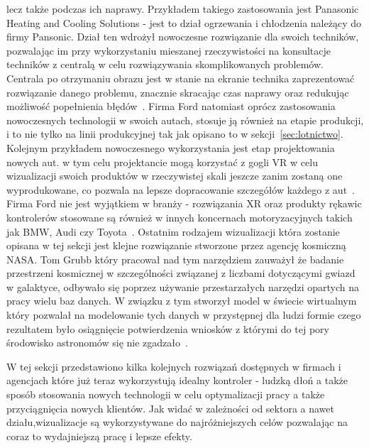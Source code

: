 lecz także podczas ich naprawy. Przykładem takiego zastosowania jest Panasonic Heating and Cooling Solutions - jest to dział ogrzewania i chłodzenia należący do firmy Pansonic. Dział ten wdrożył nowoczesne rozwiązanie dla swoich techników, pozwalając im przy wykorzystaniu  mieszanej rzeczywistości na konsultacje techników z centralą w celu rozwiązywania skomplikowanych problemów. Centrala po otrzymaniu obrazu jest w stanie na ekranie technika zaprezentować rozwiązanie danego problemu, znacznie skracając czas naprawy oraz redukując możliwość popełnienia błędów~\cite{pana}. Firma Ford natomiast oprócz zastosowania nowoczesnych technologii w swoich autach, stosuje ją również na etapie produkcji, i to nie tylko na linii produkcyjnej tak jak opisano to w sekcji~\ref{sec:lotnictwo}. Kolejnym przykładem nowoczesnego wykorzystania jest etap projektowania nowych aut. w tym celu projektancie mogą korzystać z gogli VR w celu wizualizacji swoich produktów w rzeczywistej skali jeszcze zanim zostaną one wyprodukowane, co pozwala na lepsze dopracowanie szczegółów każdego z aut~\cite{wiz1}. Firma Ford nie jest wyjątkiem w branży - rozwiązania XR oraz produkty rękawic kontrolerów stosowane są również w innych koncernach motoryzacyjnych takich jak BMW, Audi czy Toyota~\cite{manus}. Ostatnim rodzajem wizualizacji która zostanie opisana w tej sekcji jest klejne rozwiązanie stworzone przez agencję kosmiczną NASA. Tom Grubb który pracował nad tym narzędziem zauważył że badanie przestrzeni kosmicznej w szczególności związanej z liczbami dotyczącymi gwiazd w galaktyce, odbywało się poprzez używanie przestarzałych narzędzi opartych na pracy wielu baz danych. W związku z tym stworzył model w świecie wirtualnym który pozwalał na modelowanie tych danych w przystępnej dla ludzi formie czego rezultatem było osiągnięcie potwierdzenia wniosków z którymi do tej pory środowisko astronomów się nie zgadzało~\cite{nasa2}.
	
	 W tej sekcji przedstawiono kilka kolejnych rozwiązań dostępnych w firmach i agencjach które już teraz wykorzystują idealny kontroler - ludzką dłoń a także sposób stosowania nowych technologii w celu optymalizacji pracy a także przyciągnięcia nowych klientów. Jak widać w zależności od sektora a nawet działu,wizualizacje są wykorzystywane do najróżniejszych celów pozwalając na coraz to wydajniejszą pracę i lepsze efekty.
	
